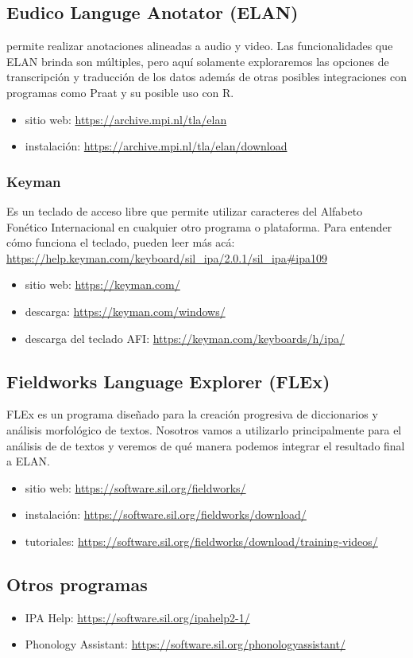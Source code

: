 \documentclass[12pt]{article}
\begin{document}
\subsection{Eudico Languge Anotator (ELAN)}

\citet{elan} permite realizar anotaciones alineadas a audio y video. Las funcionalidades que ELAN brinda son múltiples, pero aquí solamente exploraremos las opciones de transcripción y traducción de los datos además de otras posibles integraciones con programas como Praat y su posible uso con R.
\begin{itemize}
\item sitio web: \url{https://archive.mpi.nl/tla/elan} 

\item instalación: \url{https://archive.mpi.nl/tla/elan/download}
\end{itemize}
\subsubsection{Keyman}
Es un teclado de acceso libre que permite utilizar caracteres del Alfabeto Fonético Internacional en cualquier otro programa o plataforma. Para entender cómo funciona el teclado, pueden leer más acá: \url{https://help.keyman.com/keyboard/sil_ipa/2.0.1/sil_ipa#ipa109}

\begin{itemize}
\item sitio web: \url{https://keyman.com/}
\item descarga: \url{https://keyman.com/windows/}
\item descarga del teclado AFI: \url{https://keyman.com/keyboards/h/ipa/}
\end{itemize}

\subsection{Fieldworks Language Explorer (FLEx)}
FLEx es un programa diseñado para la creación progresiva de diccionarios y análisis morfológico de textos. Nosotros vamos a utilizarlo principalmente para el análisis de de textos y veremos de qué manera podemos integrar el resultado final a ELAN. 

\begin{itemize}
\item sitio web: \url{https://software.sil.org/fieldworks/}

\item instalación: \url{https://software.sil.org/fieldworks/download/}

\item tutoriales: \url{https://software.sil.org/fieldworks/download/training-videos/}
\end{itemize}

\subsection{Otros programas}

\begin{itemize}
\item IPA Help: \url {https://software.sil.org/ipahelp2-1/}
\item Phonology Assistant: \url{https://software.sil.org/phonologyassistant/}
\end{itemize}



\end{document}
